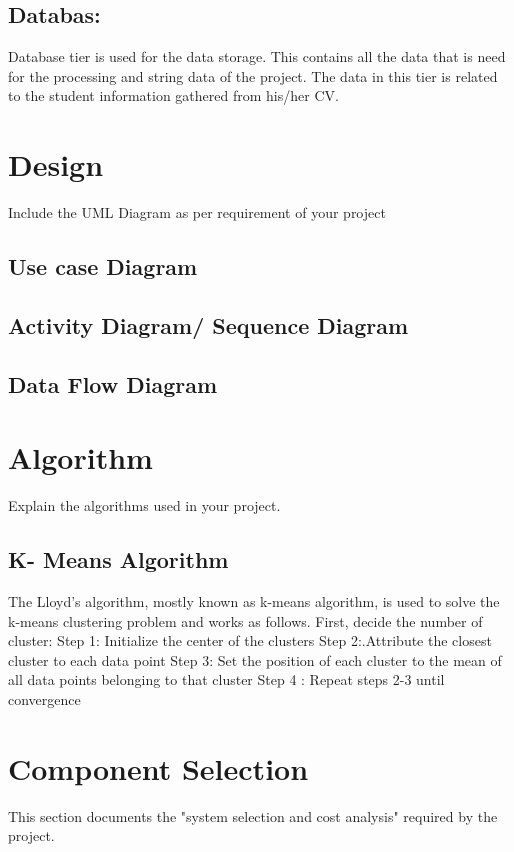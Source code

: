 \subsection{Databas:}
Database tier is used for the data storage. This contains all the data that is need for the processing and string data of the project. The data in this tier is related to the student information gathered from his/her CV.

\section{Design}

Include the UML Diagram as per requirement of your project
\subsection{Use case Diagram}

\subsection{Activity Diagram/ Sequence Diagram}

\subsection{Data Flow Diagram}

\section{Algorithm}
Explain the algorithms used in your project.
\subsection{K- Means Algorithm}
The Lloyd's algorithm, mostly known as k-means algorithm, is used to solve the k-means clustering problem and works as follows. First, decide the number of cluster:
Step 1: Initialize the center of the clusters
Step 2:.Attribute the closest cluster to each data point
Step 3: Set the position of each cluster to the mean of all data points belonging to that cluster Step 4 : Repeat steps 2-3 until convergence


\section{Component Selection}
This section documents the "system selection and cost analysis" required by the project.

